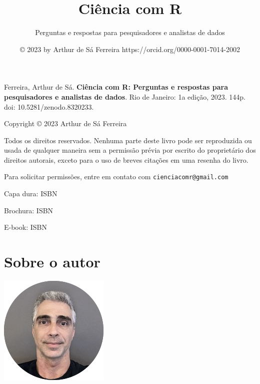 \documentclass[
  a4paper,
]{book}
\title{\textbf{Ciência com R}}
\subtitle{Perguntas e respostas para pesquisadores e analistas de dados}
\author{© 2023 by Arthur de Sá Ferreira https://orcid.org/0000-0001-7014-2002}
\date{}
\renewcommand{\href}[2]{#2\footnote{\url{#1}}}
\newcommand{\DisableFootNotes}{%
  \renewcommand{\footnote}[2][]{\relax}
}
\begin{document}
\maketitle


\newpage


\newpage

{
\setcounter{tocdepth}{1}
\tableofcontents
}
\listoffigures
\listoftables
\DisableFootNotes

\clearpage
\markboth{}{}

Ferreira, Arthur de Sá. \textbf{Ciência com R: Perguntas e respostas para pesquisadores e analistas de dados}. Rio de Janeiro: 1a edição, 2023. 144p. \href{https://doi.org/10.5281/zenodo.8320233}{doi: 10.5281/zenodo.8320233}.

\vspace*{\fill}

Copyright © 2023 Arthur de Sá Ferreira

Todos os direitos reservados. Nenhuma parte deste livro pode ser reproduzida ou usada de qualquer maneira sem a permissão prévia por escrito do proprietário dos direitos autorais, exceto para o uso de breves citações em uma resenha do livro.

Para solicitar permissões, entre em contato com \href{mailto:cienciacomr@gmail.com}{\nolinkurl{cienciacomr@gmail.com}}

Capa dura: ISBN

Brochura: ISBN

E-book: ISBN

\hypertarget{sobre-o-autor}{%
\chapter*{Sobre o autor}\label{sobre-o-autor}}

\markboth{}{}

\includegraphics{images/ASF.png}
\end{document}
